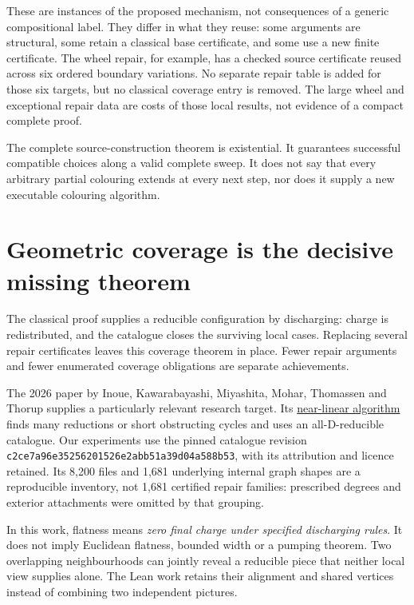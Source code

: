 These are instances of the proposed mechanism, not consequences of a
generic compositional label. They differ in what they reuse: some
arguments are structural, some retain a classical base certificate, and
some use a new finite certificate. The wheel repair, for example, has a
checked source certificate reused across six ordered boundary variations.
No separate repair table is added for those six targets, but no classical
coverage entry is removed. The large wheel and exceptional repair data are
costs of those local results, not evidence of a compact complete proof.

The complete source-construction theorem is existential. It guarantees
successful compatible choices along a valid complete sweep. It does not
say that every arbitrary partial colouring extends at every next step,
nor does it supply a new executable colouring algorithm.

\section{Geometric coverage is the decisive missing theorem}
\label{sec:current-coverage}

The classical proof supplies a reducible configuration by discharging:
charge is redistributed, and the catalogue closes the surviving local
cases. Replacing several repair certificates leaves this coverage theorem
in place. Fewer repair arguments and fewer enumerated coverage obligations
are separate achievements.

The 2026 paper by Inoue, Kawarabayashi, Miyashita, Mohar, Thomassen and
Thorup supplies a particularly relevant research target. Its
\href{https://arxiv.org/abs/2603.24880v3}{near-linear algorithm} finds many
reductions or short obstructing cycles and uses an all-D-reducible
catalogue. Our experiments use the pinned catalogue revision
\texttt{c2ce7a96e35256201526e2abb51a39d04a588b53}, with its attribution and
licence retained. Its 8,200 files and 1,681 underlying internal graph
shapes are a reproducible inventory, not 1,681 certified repair families:
prescribed degrees and exterior attachments were omitted by that grouping.

In this work, flatness means \emph{zero final charge under specified
discharging rules}. It does not imply Euclidean flatness, bounded width or
a pumping theorem. Two overlapping neighbourhoods can jointly reveal a
reducible piece that neither local view supplies alone. The Lean work
retains their alignment and shared vertices instead of combining two
independent pictures.

